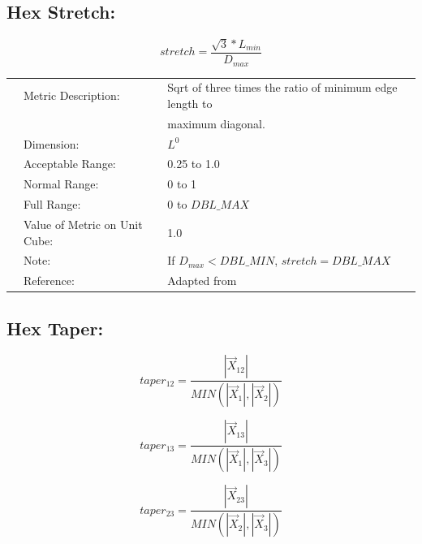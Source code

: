 \documentclass[12pt]{article}
\begin{document}
\subsection*{Hex Stretch:}

\begin{displaymath}
stretch = \frac { \sqrt{3} * L_{min} } { D_{max} }
\end{displaymath}

\begin{tabular}{lll}
& Metric Description:  & Sqrt of three times the ratio of minimum edge length to \\
&                      & maximum diagonal. \\ 
& Dimension:           & $L^0$                              \\ 
& Acceptable Range:    & 0.25 to 1.0 \\ 
& Normal Range:        & 0 to 1     \\ 
& Full Range:          & 0 to $DBL\_MAX$ \\ 
& Value of Metric on Unit Cube:    & 1.0 \\
& Note:                & If $D_{max} < DBL\_MIN$, $stretch = DBL\_MAX $ \\ 
& Reference:           & Adapted from \cite{two} \\
\end{tabular} 


\subsection*{Hex Taper:}

\begin{displaymath}
taper_{12} = \frac{\left| \vec X_{12} \right| } 
{MIN \left( \left| \vec X_1 \right|, \left| \vec X_2 \right| \right) }
\end{displaymath}

\begin{displaymath}
taper_{13} = \frac{\left| \vec X_{13} \right| } 
{MIN \left( \left| \vec X_1 \right|, \left| \vec X_3 \right| \right) }
\end{displaymath}

\begin{displaymath}
taper_{23} = \frac{\left| \vec X_{23} \right| } 
{MIN \left( \left| \vec X_2 \right|, \left| \vec X_3 \right| \right) }
\end{displaymath}
\end{document}
